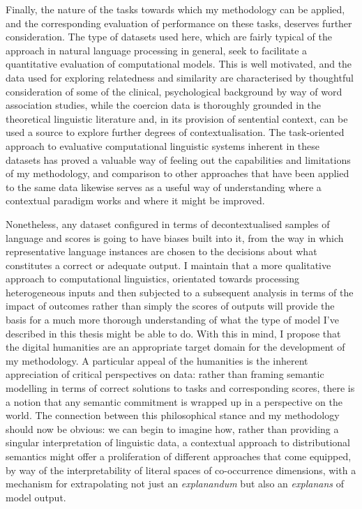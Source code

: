 Finally, the nature of the tasks towards which my methodology can be applied, and the corresponding evaluation of performance on these tasks, deserves further consideration.  The type of datasets used here, which are fairly typical of the approach in natural language processing in general, seek to facilitate a quantitative evaluation of computational models.  This is well motivated, and the data used for exploring relatedness \citep{FinkelsteinEA2002} and similarity \citep{HillEA2015} are characterised by thoughtful consideration of some of the clinical, psychological background by way of word association studies, while the coercion data \citep{PustejovskyEA2010} is thoroughly grounded in the theoretical linguistic literature and, in its provision of sentential context, can be used a source to explore further degrees of contextualisation.  The task-oriented approach to evaluative computational linguistic systems inherent in these datasets has proved a valuable way of feeling out the capabilities and limitations of my methodology, and comparison to other approaches that have been applied to the same data likewise serves as a useful way of understanding where a contextual paradigm works and where it might be improved.

Nonetheless, any dataset configured in terms of decontextualised samples of language and scores is going to have biases built into it, from the way in which representative language instances are chosen to the decisions about what constitutes a correct or adequate output.  I maintain that a more qualitative approach to computational linguistics, orientated towards processing heterogeneous inputs and then subjected to a subsequent analysis in terms of the impact of outcomes rather than simply the scores of outputs will provide the basis for a much more thorough understanding of what the type of model I've described in this thesis might be able to do.  With this in mind, I propose that the digital humanities are an appropriate target domain for the development of my methodology.  A particular appeal of the humanities is the inherent appreciation of critical perspectives on data: rather than framing semantic modelling in terms of correct solutions to tasks and corresponding scores, there is a notion that any semantic commitment is wrapped up in a perspective on the world.  The connection between this philosophical stance and my methodology should now be obvious: we can begin to imagine how, rather than providing a singular interpretation of linguistic data, a contextual approach to distributional semantics might offer a proliferation of different approaches that come equipped, by way of the interpretability of literal spaces of co-occurrence dimensions, with a mechanism for extrapolating not just an \emph{explanandum} but also an \emph{explanans} of model output.

